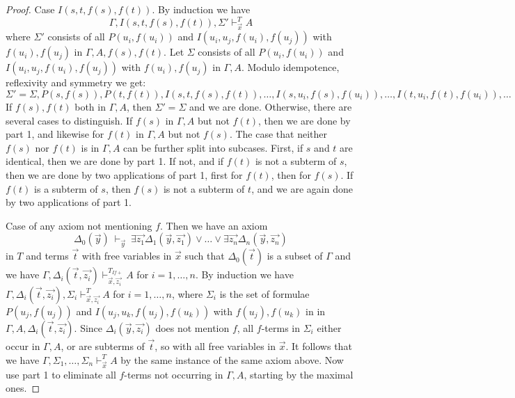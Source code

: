 \documentclass[10pt,a4paper]{article}
\begin{document}
\begin{proof}
Case $I(s,t,f(s),f(t))$. By induction we have 
\begin{equation}\label{ih:Istfsft}
\Gamma,I(s,t,f(s),f(t)),\Sigma'\vdash_{\vec{x}}^{T} A
\end{equation}
where $\Sigma'$ consists of all $P(u_i,f(u_i))$ and $I(u_i,u_j,f(u_i),f(u_j))$
with $f(u_i),f(u_j)$ in $\Gamma,A,f(s),f(t)$. 
Let $\Sigma$ consists of all $P(u_i,f(u_i))$ and $I(u_i,u_j,f(u_i),f(u_j))$
with $f(u_i),f(u_j)$ in $\Gamma,A$.
Modulo idempotence, reflexivity and symmetry we get:
\begin{equation}\label{eq:sigmas}
\Sigma' = \Sigma,P(s,f(s)),P(t,f(t)),I(s,t,f(s),f(t)),\ldots,I(s,u_i,f(s),f(u_i)),\ldots,I(t,u_i,f(t),f(u_i)),\ldots
\end{equation}
If $f(s),f(t)$ both in $\Gamma,A$,
then $\Sigma'=\Sigma$ and we are done. Otherwise, there are several cases
to distinguish. If $f(s)$ in $\Gamma,A$ but not $f(t)$, then we are done by part 1,
and likewise for $f(t)$ in $\Gamma,A$ but not $f(s)$. The case that neither
$f(s)$ nor $f(t)$ is in $\Gamma,A$ can be further split into subcases. First, if $s$ and $t$
are identical, then we are done by part 1. If not, and if $f(t)$ is not a subterm of $s$,
then we are done by two applications of part 1, first for $f(t)$, then for $f(s)$.
If $f(t)$ is a subterm of $s$, then $f(s)$ is not a subterm of $t$, and we are 
again done by two applications of part 1.

Case of any axiom not mentioning $f$. Then we have an axiom
$$
\Delta_0(\vec{y})~\vdash_{\vec{y}}~
\exists \vec{z_1}\Delta_1(\vec{y},\vec{z_1})\vee\dots\vee\exists \vec{z_n}\Delta_n(\vec{y},\vec{z_n})
$$
in $T$ and terms $\vec{t}$ with free variables in $\vec{x}$ such
that $\Delta_0(\vec{t})$ is a subset of $\Gamma$ and we have
$\Gamma,\Delta_i(\vec{t},\vec{z_i})\vdash_{\vec{x},\vec{z_i}}^{T_{I\!f{+}}} A$ 
for $i=1,\dots,n$.
By induction we have $\Gamma,\Delta_i(\vec{t},\vec{z_i}), \Sigma_i\vdash_{\vec{x},\vec{z_i}}^{T} A$
for $i = 1,\dots,n$, where $\Sigma_i$ is the set of formulae $P(u_j,f(u_j))$ and $I(u_j,u_k,f(u_j),f(u_k))$
with $f(u_j),f(u_k)$ in in $\Gamma,A,\Delta_i(\vec{t},\vec{z_i})$.
Since $\Delta_i(\vec{y},\vec{z_i})$ does not mention $f$, all $f$-terms in
$\Sigma_i$  either occur in $\Gamma,A$, or are subterms of $\vec{t}$, so with
all free variables in $\vec{x}$. It follows that we have
$\Gamma,\Sigma_1,\dots,\Sigma_n\vdash_{\vec{x}}^{T} A$
by the same instance of the same axiom above. Now use part 1 to eliminate
all $f$-terms not occurring in $\Gamma,A$, starting by the maximal ones.
\end{proof}
\end{document}
